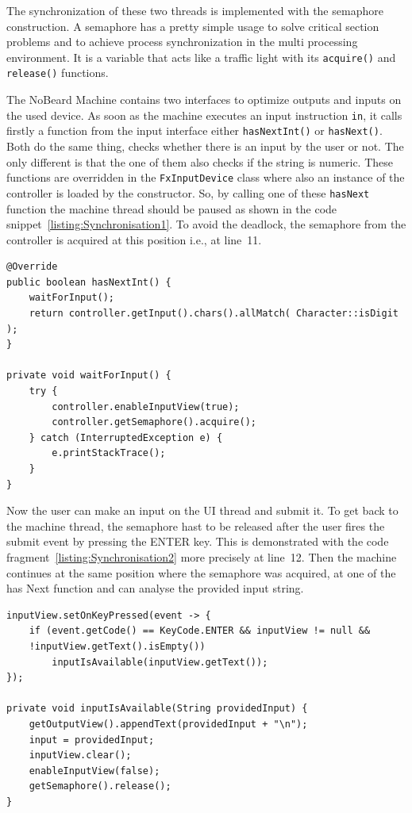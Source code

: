 The synchronization of these two threads is implemented with the semaphore construction. A semaphore has a pretty simple usage to solve critical section problems and to achieve process synchronization in the multi processing environment. It is a variable that acts like a traffic light with its \lstinline$acquire()$ and \lstinline$release()$ functions.

The NoBeard Machine contains two interfaces to optimize outputs and inputs on the used device. As soon as the machine executes an input instruction \lstinline$in$, it calls firstly a function from the input interface either \lstinline$hasNextInt()$ or \lstinline$hasNext()$. Both do the same thing, checks whether there is an input by the user or not. The only different is that the one of them also checks if the string is numeric. These functions are overridden in the \lstinline$FxInputDevice$ class where also an instance of the controller is loaded by the constructor. So, by calling one of these \lstinline$hasNext$ function the machine thread should be paused as shown in the code snippet~\ref{listing:Synchronisation1}. To avoid the deadlock, the semaphore from the controller is acquired at this position i.e., at line~11.
\begin{lstlisting}[caption={Synchronisation with semaphore (Part 1)},label=listing:Synchronisation1]
@Override
public boolean hasNextInt() {
    waitForInput();
    return controller.getInput().chars().allMatch( Character::isDigit );
}

private void waitForInput() {
    try {
        controller.enableInputView(true);
        controller.getSemaphore().acquire();
    } catch (InterruptedException e) {
        e.printStackTrace();
    }
}
\end{lstlisting}
Now the user can make an input on the UI thread and submit it. To get back to the machine thread, the semaphore hast to be released after the user fires the submit event by pressing the ENTER key. This is demonstrated with the code fragment~\ref{listing:Synchronisation2} more precisely at line~12. Then the machine continues at the same position where the semaphore was acquired, at one of the has Next function and can analyse the provided input string.
\begin{lstlisting}[caption={Synchronisation with semaphore (Part 2)},label=listing:Synchronisation2]
inputView.setOnKeyPressed(event -> {
    if (event.getCode() == KeyCode.ENTER && inputView != null && 
    !inputView.getText().isEmpty())
        inputIsAvailable(inputView.getText());
});

private void inputIsAvailable(String providedInput) {
    getOutputView().appendText(providedInput + "\n");
    input = providedInput;
    inputView.clear();
    enableInputView(false);
    getSemaphore().release();
}
\end{lstlisting}

